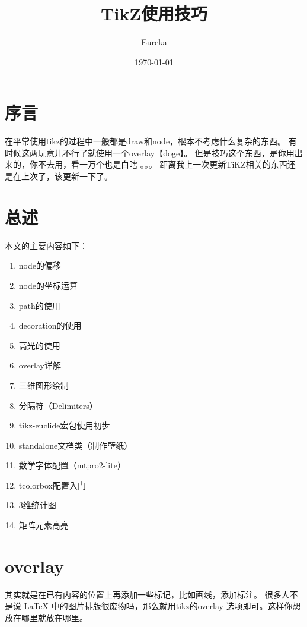 \documentclass[12pt]{article}
\title{TikZ使用技巧}
\author{Eureka}
\date{\today}
\begin{document}
\maketitle
\tableofcontents
\clearpage

\section{序言}
在平常使用tikz的过程中一般都是draw和node，根本不考虑什么复杂的东西。
有时候这两玩意儿不行了就使用一个overlay【doge】。
但是技巧这个东西，是你用出来的，你不去用，看一万个也是白瞎 。。。
距离我上一次更新TiKZ相关的东西还是在上次了，该更新一下了。


\section{总述}
本文的主要内容如下：

\begin{multicols}{2}
    \begin{enumerate}[(1)]
        \item node的偏移
        \item node的坐标运算
        \item path的使用
        \item decoration的使用
        \item 高光的使用
        \item overlay详解
        \item 三维图形绘制
        \item 分隔符（Delimiters）
        \item tikz-euclide宏包使用初步
        \item standalone文档类（制作壁纸）
        \item 数学字体配置（mtpro2-lite）
        \item tcolorbox配置入门
        \item 3维统计图
        \item 矩阵元素高亮
    \end{enumerate}
\end{multicols}


\section{overlay}
其实就是在已有内容的位置上再添加一些标记，比如画线，添加标注。
很多人不是说 \LaTeX{} 中的图片排版很废物吗，那么就用tikz的overlay
选项即可。这样你想放在哪里就放在哪里。
\end{document}
